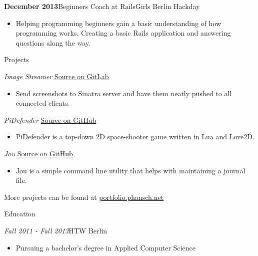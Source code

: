 \documentclass[12pt]{article}
\begin{document}
\textbf{December 2013}\hfill Beginners Coach at RailsGirls Berlin Hackday
\begin{itemize}
  \setlength{\itemsep}{0cm}
  \setlength{\parskip}{0cm}

  \item Helping programming beginners gain a basic understanding of how programming works. Creating a basic Rails application and answering questions along the way.
\end{itemize}

\vspace{0.5cm}
{\Large Projects}

\emph{Image Streamer} \hfill \href{https://gitlab.com/phansch/screenshot-streamer/tree/master}{Source on GitLab}
\begin{itemize}
  \setlength{\itemsep}{0cm}
  \setlength{\parskip}{0cm}

  \item[] Send screenshots to Sinatra server and have them neatly pushed to all connected clients.
\end{itemize}

\emph{PiDefender} \hfill \href{https://gitlab.com/phansch/pidefender/tree/master}{Source on GitHub}
\begin{itemize}
  \setlength{\itemsep}{0cm}
  \setlength{\parskip}{0cm}

  \item[] PiDefender is a top-down 2D space-shooter game written in Lua and Love2D.
\end{itemize}


\emph{Jou} \hfill \href{https://github.com/phansch/jou}{Source on GitHub}
\begin{itemize}
  \setlength{\itemsep}{0cm}
  \setlength{\parskip}{0cm}

  \item[] Jou is a simple command line utility that helps with maintaining a journal file.
\end{itemize}

More projects can be found at \href{https://phansch.net/}{portfolio.phansch.net}

\vspace{0.5cm}
{\Large Education}

\emph{Fall 2011 - Fall 2013}\hfill HTW Berlin
\begin{itemize}
  \setlength{\itemsep}{0cm}
  \setlength{\parskip}{0.1cm}
  \item[] Pursuing a bachelor's degree in Applied Computer Science
\end{itemize}
\end{document}

